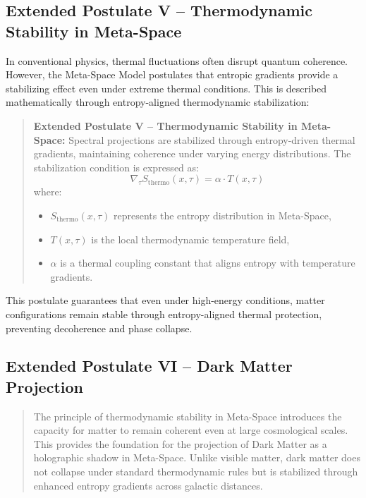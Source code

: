 \documentclass[10.5pt,a4paper]{article}
\begin{document}
\subsection{Extended Postulate V – Thermodynamic Stability in Meta-Space}

In conventional physics, thermal fluctuations often disrupt quantum coherence. However, the Meta-Space Model 
postulates that entropic gradients provide a stabilizing effect even under extreme thermal conditions. 
This is described mathematically through entropy-aligned thermodynamic stabilization:

\begin{quote}
\textbf{Extended Postulate V – Thermodynamic Stability in Meta-Space:}  
Spectral projections are stabilized through entropy-driven thermal gradients, maintaining coherence 
under varying energy distributions. The stabilization condition is expressed as:
\[
\nabla_\tau S_{\mathrm{thermo}}(x, \tau) = \alpha \cdot T(x, \tau)
\]
where:
\begin{itemize}
    \item \( S_{\mathrm{thermo}}(x, \tau) \) represents the entropy distribution in Meta-Space,
    \item \( T(x, \tau) \) is the local thermodynamic temperature field,
    \item \( \alpha \) is a thermal coupling constant that aligns entropy with temperature gradients.
\end{itemize}
\end{quote}

This postulate guarantees that even under high-energy conditions, matter configurations remain stable 
through entropy-aligned thermal protection, preventing decoherence and phase collapse.

\subsection{Extended Postulate VI – Dark Matter Projection}

\begin{quote}
The principle of thermodynamic stability in Meta-Space introduces the capacity for matter to remain coherent 
even at large cosmological scales. This provides the foundation for the projection of Dark Matter as 
a holographic shadow in Meta-Space. Unlike visible matter, dark matter does not collapse under standard thermodynamic 
rules but is stabilized through enhanced entropy gradients across galactic distances.
\end{quote}
\end{document}
